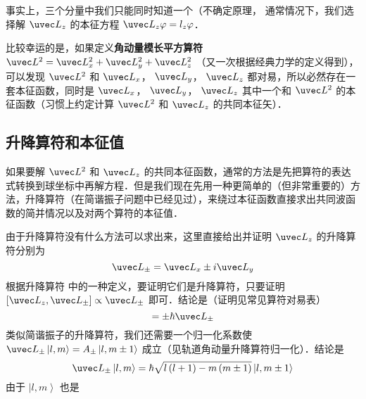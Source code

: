 事实上，三个分量中我们只能同时知道一个（不确定原理，%
通常情况下，我们选择解 ${\uvec L_z}$ 的本征方程 ${\uvec L_z}\varphi  = {l_z}\varphi $． 

比较幸运的是，如果定义\textbf{角动量模长平方算符} ${\uvec L^2} = \uvec L_x^2 + \uvec L_y^2 + \uvec L_z^2$ （又一次根据经典力学的定义得到），可以发现 $\uvec L^2$ 和 $\uvec L_x$， $\uvec L_y$，  $\uvec L_z$ 都对易，所以必然存在一套本征函数，同时是 $\uvec L_x$， $\uvec L_y$，  $\uvec L_z$ 其中一个和 $\uvec L^2$ 的本征函数（习惯上约定计算 $\uvec L^2$ 和 $\uvec L_z$ 的共同本征矢）．

\subsection{升降算符和本征值}

如果要解 $\uvec L^2$ 和 $\uvec L_z$ 的共同本征函数，通常的方法是先把算符的表达式转换到球坐标中再解方程．但是我们现在先用一种更简单的（但非常重要的）方法，升降算符（在简谐振子问题中已经见过），来绕过本征函数直接求出共同波函数的简并情况以及对两个算符的本征值．

由于升降算符没有什么方法可以求出来，这里直接给出并证明 $\uvec L_z$ 的升降算符分别为
\begin{equation}
{\uvec L_ \pm } = {\uvec L_x} \pm i{\uvec L_y}
\end{equation}
根据升降算符%
中的一种定义，要证明它们是升降算符，只要证明 $[{\uvec L_z},{\uvec L_ \pm }] \propto {\uvec L_ \pm }$ 即可．结论是（证明见常见算符对易表）%
\begin{equation}
[{\uvec L_z},{\uvec L_ \pm }] =  \pm \hbar {\uvec L_ \pm }
\end{equation}
类似简谐振子的升降算符，我们还需要一个归一化系数使 ${\uvec L_ \pm }\left| {l,m} \right\rangle  = {A_ \pm }\left| {l,m \pm 1} \right\rangle $ 成立（见轨道角动量升降算符归一化）．结论是
\begin{equation}
{\uvec L_ \pm }\left| {l,m} \right\rangle  = \hbar \sqrt {l\left( {l + 1} \right) - m\left( {m \pm 1} \right)} \left| {l,m \pm 1} \right\rangle 
\end{equation}
由于 $\left| {l,m} \right\rangle $ 也是



